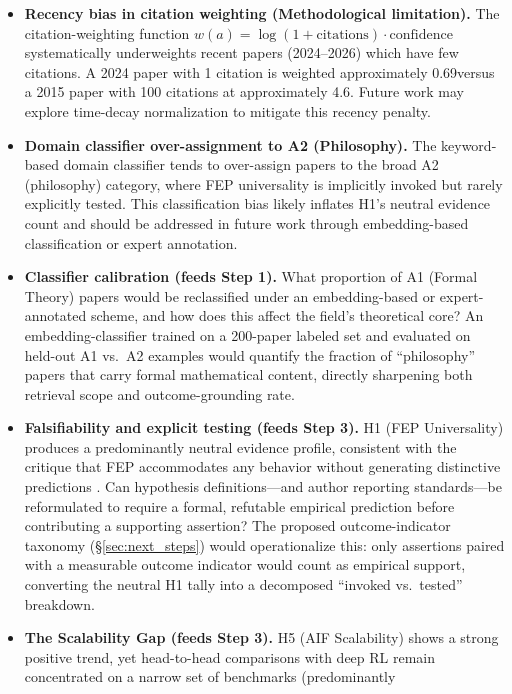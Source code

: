 \documentclass[
  english,
]{article}
\begin{document}
\begin{itemize}
\item
  \textbf{Recency bias in citation weighting (Methodological
  limitation).} The citation-weighting function
  \(w(a) = \log(1+\text{citations}) \cdot \text{confidence}\)
  systematically underweights recent papers (2024--2026) which have few
  citations. A 2024 paper with 1 citation is weighted approximately
  0.69\times versus a 2015 paper with 100 citations at approximately
  4.6\times. Future work may explore time-decay normalization to
  mitigate this recency penalty.
\item
  \textbf{Domain classifier over-assignment to A2 (Philosophy).} The
  keyword-based domain classifier tends to over-assign papers to the
  broad A2 (philosophy) category, where FEP universality is implicitly
  invoked but rarely explicitly tested. This classification bias likely
  inflates H1's neutral evidence count and should be addressed in future
  work through embedding-based classification or expert annotation.
\item
  \textbf{Classifier calibration (feeds Step 1).} What proportion of A1
  (Formal Theory) papers would be reclassified under an embedding-based
  or expert-annotated scheme, and how does this affect the field's
  theoretical core? An embedding-classifier trained on a 200-paper
  labeled set and evaluated on held-out A1 vs.~A2 examples would
  quantify the fraction of ``philosophy'' papers that carry formal
  mathematical content, directly sharpening both retrieval scope and
  outcome-grounding rate.
\item
  \textbf{Falsifiability and explicit testing (feeds Step 3).} H1 (FEP
  Universality) produces a predominantly neutral evidence profile,
  consistent with the critique that FEP accommodates any behavior
  without generating distinctive predictions \citep{colombo2021free}.
  Can hypothesis definitions---and author reporting standards---be
  reformulated to require a formal, refutable empirical prediction
  before contributing a supporting assertion? The proposed
  outcome-indicator taxonomy (§\ref{sec:next_steps}) would
  operationalize this: only assertions paired with a measurable outcome
  indicator would count as empirical support, converting the neutral H1
  tally into a decomposed ``invoked vs.~tested'' breakdown.
\item
  \textbf{The Scalability Gap (feeds Step 3).} H5 (AIF Scalability)
  shows a strong positive trend, yet head-to-head comparisons with deep
  RL remain concentrated on a narrow set of benchmarks (predominantly

\end{itemize}
\end{document}
